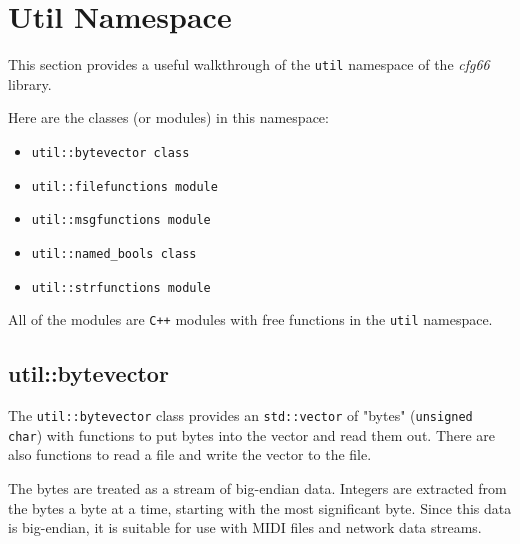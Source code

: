 %
%
%

\section{Util Namespace}
\label{sec:util_namespace}

   This section provides a useful walkthrough of the \texttt{util} namespace of
   the \textsl{cfg66} library.

   Here are the classes (or modules) in this namespace:

   \begin{itemize}
      \item \texttt{util::bytevector class}
      \item \texttt{util::filefunctions module}
      \item \texttt{util::msgfunctions module}
      \item \texttt{util::named\_bools class}
      \item \texttt{util::strfunctions module}
   \end{itemize}

   All of the modules are \texttt{C++} modules with free functions
   in the \texttt{util} namespace.

\subsection{util::bytevector}
\label{subsec:util_namespace_bytevector}

   The \texttt{util::bytevector} class
   provides an \texttt{std::vector} of "bytes" (\texttt{unsigned char}) with
   functions to put bytes into the vector and read them out.
   There are also functions to read a file and write the vector to the
   file.

   The bytes are treated as a stream of big-endian data.
   Integers are extracted from the bytes a byte at a time, starting with
   the most significant byte.
   Since this data is big-endian, it is suitable for use with MIDI
   files and network data streams.

